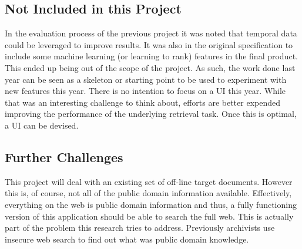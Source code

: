 \documentclass{mprop}
\begin{document}

\subsection{Not Included in this Project}
In the evaluation process of the previous project it was noted that temporal data could be leveraged to improve results. It was also in the original specification to include some machine learning (or learning to rank) features in the final product. This ended up being out of the scope of the project. As such, the work done last year can be seen as a skeleton or starting point to be used to experiment with new features this year. There is no intention to focus on a UI this year. While that was an interesting challenge to think about, efforts are better expended improving the performance of the underlying retrieval task. Once this is optimal, a UI can be devised.

\subsection{Further Challenges}
This project will deal with an existing set of off-line target documents. However this is, of course, not all of the public domain information available. Effectively, everything on the web is public domain information and thus, a fully functioning version of this application should be able to search the full web. This is actually part of the problem this research tries to address. Previously archivists use insecure web search to find out what was public domain knowledge.
\end{document}
